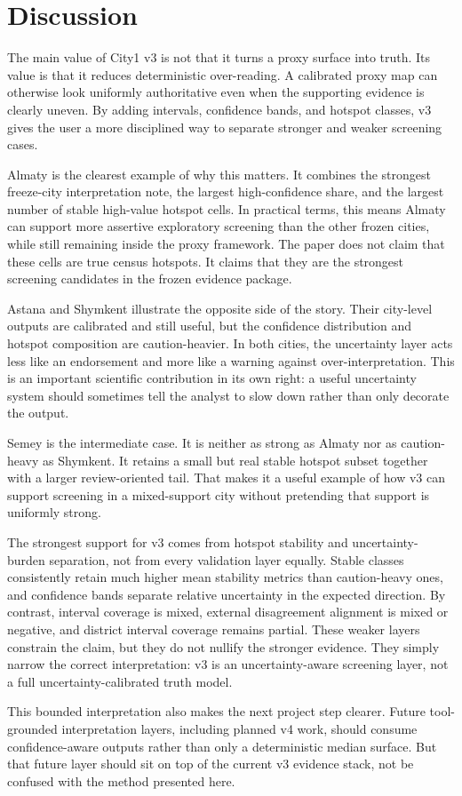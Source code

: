 \section{Discussion}

The main value of City1 v3 is not that it turns a proxy surface into truth. Its value is that it reduces deterministic over-reading. A calibrated proxy map can otherwise look uniformly authoritative even when the supporting evidence is clearly uneven. By adding intervals, confidence bands, and hotspot classes, v3 gives the user a more disciplined way to separate stronger and weaker screening cases.

Almaty is the clearest example of why this matters. It combines the strongest freeze-city interpretation note, the largest high-confidence share, and the largest number of stable high-value hotspot cells. In practical terms, this means Almaty can support more assertive exploratory screening than the other frozen cities, while still remaining inside the proxy framework. The paper does not claim that these cells are true census hotspots. It claims that they are the strongest screening candidates in the frozen evidence package.

Astana and Shymkent illustrate the opposite side of the story. Their city-level outputs are calibrated and still useful, but the confidence distribution and hotspot composition are caution-heavier. In both cities, the uncertainty layer acts less like an endorsement and more like a warning against over-interpretation. This is an important scientific contribution in its own right: a useful uncertainty system should sometimes tell the analyst to slow down rather than only decorate the output.

Semey is the intermediate case. It is neither as strong as Almaty nor as caution-heavy as Shymkent. It retains a small but real stable hotspot subset together with a larger review-oriented tail. That makes it a useful example of how v3 can support screening in a mixed-support city without pretending that support is uniformly strong.

The strongest support for v3 comes from hotspot stability and uncertainty-burden separation, not from every validation layer equally. Stable classes consistently retain much higher mean stability metrics than caution-heavy ones, and confidence bands separate relative uncertainty in the expected direction. By contrast, interval coverage is mixed, external disagreement alignment is mixed or negative, and district interval coverage remains partial. These weaker layers constrain the claim, but they do not nullify the stronger evidence. They simply narrow the correct interpretation: v3 is an uncertainty-aware screening layer, not a full uncertainty-calibrated truth model.

This bounded interpretation also makes the next project step clearer. Future tool-grounded interpretation layers, including planned v4 work, should consume confidence-aware outputs rather than only a deterministic median surface. But that future layer should sit on top of the current v3 evidence stack, not be confused with the method presented here.

